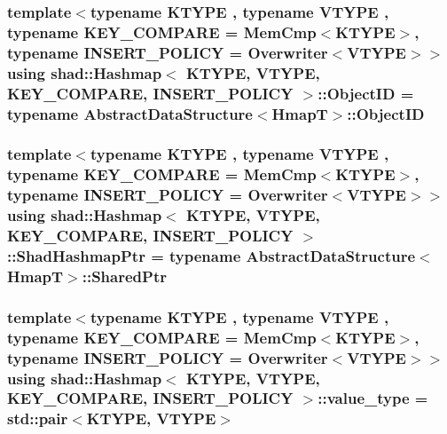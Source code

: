 \hypertarget{classshad_1_1Hashmap_a1f10a3b0cce639008b5b9444eb167f8b}{
\subsubsection[{Object\-I\-D}]{\setlength{\rightskip}{0pt plus 5cm}template$<$typename K\-T\-Y\-P\-E , typename V\-T\-Y\-P\-E , typename K\-E\-Y\-\_\-\-C\-O\-M\-P\-A\-R\-E  = Mem\-Cmp$<$\-K\-T\-Y\-P\-E$>$, typename I\-N\-S\-E\-R\-T\-\_\-\-P\-O\-L\-I\-C\-Y  = Overwriter$<$\-V\-T\-Y\-P\-E$>$$>$ using {\bf shad\-::\-Hashmap}$<$ K\-T\-Y\-P\-E, V\-T\-Y\-P\-E, K\-E\-Y\-\_\-\-C\-O\-M\-P\-A\-R\-E, I\-N\-S\-E\-R\-T\-\_\-\-P\-O\-L\-I\-C\-Y $>$\-::{\bf Object\-I\-D} =  typename {\bf Abstract\-Data\-Structure}$<${\bf Hmap\-T}$>$\-::{\bf Object\-I\-D}}}\label{classshad_1_1Hashmap_a1f10a3b0cce639008b5b9444eb167f8b}
\hypertarget{classshad_1_1Hashmap_a5d013a5199b5745a1877b321af1b86ee}{
\subsubsection[{Shad\-Hashmap\-Ptr}]{\setlength{\rightskip}{0pt plus 5cm}template$<$typename K\-T\-Y\-P\-E , typename V\-T\-Y\-P\-E , typename K\-E\-Y\-\_\-\-C\-O\-M\-P\-A\-R\-E  = Mem\-Cmp$<$\-K\-T\-Y\-P\-E$>$, typename I\-N\-S\-E\-R\-T\-\_\-\-P\-O\-L\-I\-C\-Y  = Overwriter$<$\-V\-T\-Y\-P\-E$>$$>$ using {\bf shad\-::\-Hashmap}$<$ K\-T\-Y\-P\-E, V\-T\-Y\-P\-E, K\-E\-Y\-\_\-\-C\-O\-M\-P\-A\-R\-E, I\-N\-S\-E\-R\-T\-\_\-\-P\-O\-L\-I\-C\-Y $>$\-::{\bf Shad\-Hashmap\-Ptr} =  typename {\bf Abstract\-Data\-Structure}$<${\bf Hmap\-T}$>$\-::{\bf Shared\-Ptr}}}\label{classshad_1_1Hashmap_a5d013a5199b5745a1877b321af1b86ee}
\hypertarget{classshad_1_1Hashmap_ad8c0108347b59bcd19ccb8070a313dd8}{
\subsubsection[{value\-\_\-type}]{\setlength{\rightskip}{0pt plus 5cm}template$<$typename K\-T\-Y\-P\-E , typename V\-T\-Y\-P\-E , typename K\-E\-Y\-\_\-\-C\-O\-M\-P\-A\-R\-E  = Mem\-Cmp$<$\-K\-T\-Y\-P\-E$>$, typename I\-N\-S\-E\-R\-T\-\_\-\-P\-O\-L\-I\-C\-Y  = Overwriter$<$\-V\-T\-Y\-P\-E$>$$>$ using {\bf shad\-::\-Hashmap}$<$ K\-T\-Y\-P\-E, V\-T\-Y\-P\-E, K\-E\-Y\-\_\-\-C\-O\-M\-P\-A\-R\-E, I\-N\-S\-E\-R\-T\-\_\-\-P\-O\-L\-I\-C\-Y $>$\-::{\bf value\-\_\-type} =  std\-::pair$<$K\-T\-Y\-P\-E, V\-T\-Y\-P\-E$>$}}\label{classshad_1_1Hashmap_ad8c0108347b59bcd19ccb8070a313dd8}


